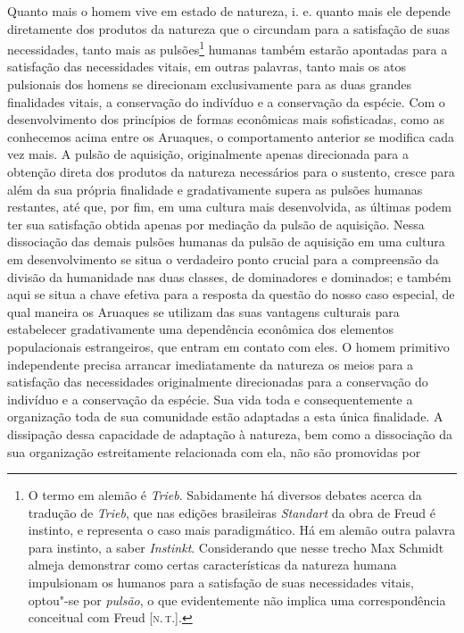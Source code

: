 Quanto mais o homem vive em estado de natureza, i. e. quanto mais ele
depende diretamente dos produtos da natureza que o circundam para a
satisfação de suas necessidades, tanto mais as pulsões\footnote{O termo em alemão é \textit{Trieb}. Sabidamente há diversos debates
  acerca da tradução de \textit{Trieb}, que nas edições brasileiras
  \textit{Standart} da obra de Freud é instinto, e representa o caso mais
  paradigmático. Há em alemão outra palavra para instinto, a saber
  \textit{Instinkt}. Considerando que nesse trecho Max Schmidt almeja
  demonstrar como certas características da natureza humana impulsionam os
  humanos para a satisfação de suas necessidades vitais, optou"-se por
  \textit{pulsão}, o que evidentemente não implica uma correspondência
  conceitual com Freud {[}\textsc{n.\,t.}{]}.} humanas também
estarão apontadas para a satisfação das necessidades vitais, em outras
palavras, tanto mais os atos pulsionais dos homens se direcionam
exclusivamente para as duas grandes finalidades vitais, a conservação
do indivíduo e a conservação da espécie. Com o desenvolvimento dos
princípios de formas econômicas mais sofisticadas, como as conhecemos
acima entre os Aruaques, o comportamento anterior se modifica cada vez
mais. A pulsão de aquisição, originalmente apenas direcionada para a
obtenção direta dos produtos da natureza necessários para o sustento,
cresce para além da sua própria finalidade e gradativamente supera as
pulsões humanas restantes, até que, por fim, em uma cultura mais
desenvolvida, as últimas podem ter sua satisfação obtida apenas por
mediação da pulsão de aquisição. Nessa dissociação das demais pulsões
humanas da pulsão de aquisição em uma cultura em desenvolvimento se
situa o verdadeiro ponto crucial para a compreensão da divisão da
humanidade nas duas classes, de dominadores e dominados; e também aqui
se situa a chave efetiva para a resposta da questão do nosso caso
especial, de qual maneira os Aruaques se utilizam das suas vantagens
culturais para estabelecer gradativamente uma dependência econômica
dos elementos populacionais estrangeiros, que entram em contato com
eles. O homem primitivo independente precisa arrancar imediatamente da
natureza os meios para a satisfação das necessidades originalmente
direcionadas para a conservação do indivíduo e a conservação da
espécie. Sua vida toda e consequentemente a organização toda de sua
comunidade estão adaptadas a esta única finalidade. A dissipação dessa
capacidade de adaptação à natureza, bem como a dissociação da sua
organização estreitamente relacionada com ela, não são promovidas por
